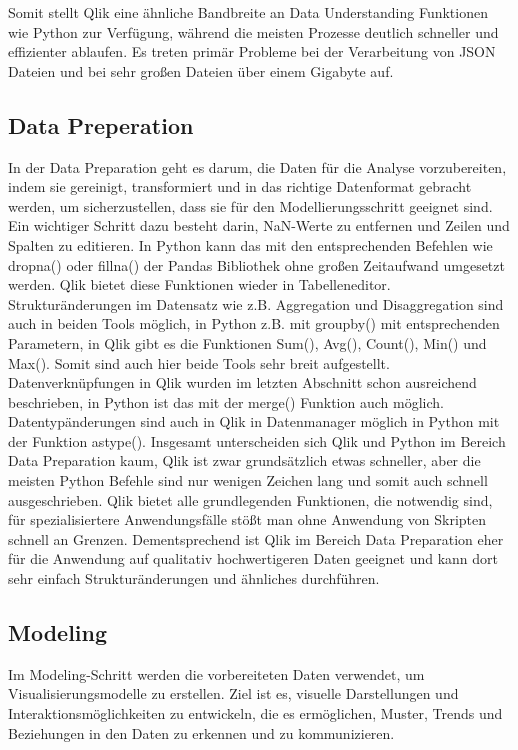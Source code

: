 \documentclass[12pt]{article}
\begin{document}
	Somit stellt Qlik eine ähnliche Bandbreite an Data Understanding Funktionen wie Python zur Verfügung, während die meisten Prozesse deutlich schneller und effizienter ablaufen. Es treten primär Probleme bei der Verarbeitung von JSON Dateien und bei sehr großen Dateien über einem Gigabyte auf.
	
	\subsection{Data Preperation}
	In der Data Preparation geht es darum, die Daten für die Analyse vorzubereiten, indem sie gereinigt, transformiert und in das richtige Datenformat gebracht werden, um sicherzustellen, dass sie für den Modellierungsschritt geeignet sind.
	Ein wichtiger Schritt dazu besteht darin, NaN-Werte zu entfernen und Zeilen und Spalten zu editieren. In Python kann das mit den entsprechenden Befehlen wie dropna() oder fillna() der Pandas Bibliothek ohne großen Zeitaufwand umgesetzt werden.
	Qlik bietet diese Funktionen wieder in Tabelleneditor.
	Strukturänderungen im Datensatz wie z.B. Aggregation und Disaggregation sind auch in beiden Tools möglich, in Python z.B. mit groupby() mit entsprechenden Parametern, in Qlik gibt es die Funktionen Sum(), Avg(), Count(), Min() und Max().
	Somit sind auch hier beide Tools sehr breit aufgestellt.
	Datenverknüpfungen in Qlik wurden im letzten Abschnitt schon ausreichend beschrieben, in Python ist das mit der  merge() Funktion auch möglich.
	Datentypänderungen sind auch in Qlik in Datenmanager möglich in Python mit der Funktion astype().
	Insgesamt unterscheiden sich Qlik und Python im Bereich Data Preparation kaum, Qlik ist zwar grundsätzlich etwas schneller, aber die meisten Python Befehle sind nur wenigen Zeichen lang und somit auch schnell ausgeschrieben. Qlik bietet alle grundlegenden Funktionen, die notwendig sind, für spezialisiertere Anwendungsfälle stößt man ohne Anwendung von Skripten schnell an Grenzen. Dementsprechend ist Qlik im Bereich Data Preparation eher für die Anwendung auf qualitativ hochwertigeren Daten geeignet und kann dort sehr einfach Strukturänderungen und ähnliches durchführen.
	
	
	\subsection{Modeling}
	Im Modeling-Schritt werden die vorbereiteten Daten verwendet, um Visualisierungsmodelle zu erstellen. Ziel ist es, visuelle Darstellungen und Interaktionsmöglichkeiten zu entwickeln, die es ermöglichen, Muster, Trends und Beziehungen in den Daten zu erkennen und zu kommunizieren.
	
\end{document}
